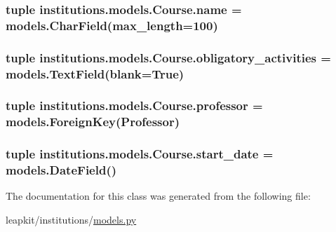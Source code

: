 \hypertarget{classinstitutions_1_1models_1_1_course_ad5ebb3105c1d4829fa8c856135aabfba}{
\subsubsection[{name}]{\setlength{\rightskip}{0pt plus 5cm}tuple institutions.\-models.\-Course.\-name = models.\-Char\-Field(max\-\_\-length=100)\hspace{0.3cm}{\ttfamily [static]}}}\label{classinstitutions_1_1models_1_1_course_ad5ebb3105c1d4829fa8c856135aabfba}
\hypertarget{classinstitutions_1_1models_1_1_course_ac211becffaff0a8f2a941f3376e61926}{
\subsubsection[{obligatory\-\_\-activities}]{\setlength{\rightskip}{0pt plus 5cm}tuple institutions.\-models.\-Course.\-obligatory\-\_\-activities = models.\-Text\-Field(blank=True)\hspace{0.3cm}{\ttfamily [static]}}}\label{classinstitutions_1_1models_1_1_course_ac211becffaff0a8f2a941f3376e61926}
\hypertarget{classinstitutions_1_1models_1_1_course_a6c35db5cbc1f01d81fac65654377527e}{
\subsubsection[{professor}]{\setlength{\rightskip}{0pt plus 5cm}tuple institutions.\-models.\-Course.\-professor = models.\-Foreign\-Key({\bf Professor})\hspace{0.3cm}{\ttfamily [static]}}}\label{classinstitutions_1_1models_1_1_course_a6c35db5cbc1f01d81fac65654377527e}
\hypertarget{classinstitutions_1_1models_1_1_course_a9b1a2f74ce9382bd635dddd7439d0353}{
\subsubsection[{start\-\_\-date}]{\setlength{\rightskip}{0pt plus 5cm}tuple institutions.\-models.\-Course.\-start\-\_\-date = models.\-Date\-Field()\hspace{0.3cm}{\ttfamily [static]}}}\label{classinstitutions_1_1models_1_1_course_a9b1a2f74ce9382bd635dddd7439d0353}


The documentation for this class was generated from the following file\-:\begin{DoxyCompactItemize}
\item 
leapkit/institutions/\hyperlink{institutions_2models_8py}{models.\-py}\end{DoxyCompactItemize}
